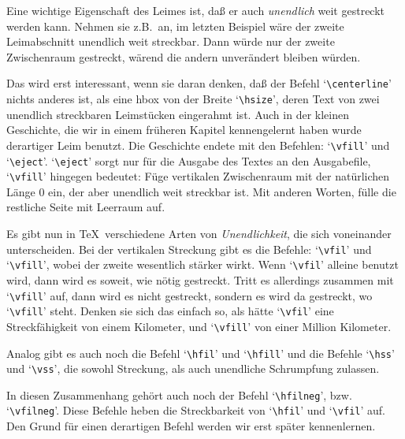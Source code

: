 Eine wichtige Eigenschaft des Leimes ist, da\ss{} er auch {\em unendlich}
weit gestreckt werden kann. Nehmen sie z.B.\ an, im letzten Beispiel
w\"are der zweite Leimabschnitt unendlich weit streckbar. Dann w\"urde nur
der zweite 
Zwischenraum gestreckt, w\"arend die andern unver\"andert
bleiben w\"urden.

Das wird erst interessant, wenn sie daran denken, da\ss{}
der Befehl 
`\verb|\centerline|' nichts anderes ist, als
eine hbox von der Breite 
`\verb|\hsize|', deren Text von zwei
unendlich streckbaren Leimst\"ucken eingerahmt ist. Auch in der kleinen
Geschichte, die wir in einem fr\"uheren Kapitel kennengelernt haben
wurde derartiger Leim benutzt. Die Geschichte endete mit den Befehlen:
`\verb|\vfill|' und 
`\verb|\eject|'. `\verb|\eject|' sorgt nur f\"ur die
Ausgabe des Textes an den 
Ausgabefile, `\verb|\vfill|' hingegen
bedeutet: F\"uge vertikalen 
Zwischenraum mit der nat\"urlichen L\"ange 0
ein, der aber unendlich weit streckbar ist. Mit anderen Worten, f\"ulle
die restliche 
Seite mit Leerraum auf.

Es gibt nun in \TeX\ verschiedene Arten von {\em Unendlichkeit}, die
sich voneinander unterscheiden. Bei der vertikalen Streckung gibt es
die Befehle: 
`\verb|\vfil|' und `\verb|\vfill|', wobei der zweite
wesentlich st\"arker wirkt. Wenn `\verb|\vfil|' alleine benutzt wird,
dann wird es soweit, wie n\"otig gestreckt. Tritt es allerdings zusammen
mit `\verb|\vfill|' auf, dann wird es nicht gestreckt, sondern es wird
da gestreckt, wo `\verb|\vfill|' steht. Denken sie sich das einfach
so, als h\"atte `\verb|\vfil|' eine Streckf\"ahigkeit von einem Kilometer,
und `\verb|\vfill|' von einer Million Kilometer.

Analog gibt es auch noch die Befehl
`\verb|\hfil|' und
`\verb|\hfill|'
und die Befehle 
`\verb|\hss|' und 
`\verb|\vss|', die sowohl Streckung,
als auch unendliche Schrumpfung zulassen.

In diesen Zusammenhang geh\"ort auch noch der Befehl
`\verb|\hfilneg|',
bzw.\ 
`\verb|\vfilneg|'. Diese Befehle heben die Streckbarkeit von
`\verb|\hfil|' und `\verb|\vfil|' auf. Den Grund f\"ur einen derartigen
Befehl werden wir erst sp\"ater kennenlernen.


